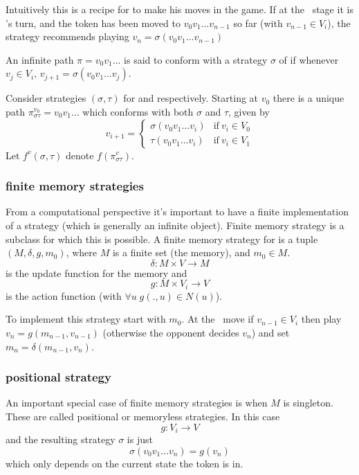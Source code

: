 Intuitively this is a recipe for  to make his moves in the game. If at the \nth\ stage it is 's turn, and the token has been moved to $v_0v_1 \ldots v_{n-1}$ so far (with $v_{n-1} \in V_i$), the strategy recommends playing $v_n=\sigma(v_0v_1 \ldots v_{n-1})$

An infinite path $\pi= v_0 v_1 \ldots$ is said to conform with a strategy $\sigma$ of  if whenever $v_j \in V_i$, $v_{j+1}=\sigma(v_0 v_1 \ldots v_j)$.

Consider strategies $(\sigma,\tau)$ for  and  respectively. Starting at $v_0$ there is a unique path $\pi^{v_0}_{\sigma\tau}= v_0 v_1 \ldots $ which conforms with both $\sigma$ and $\tau$, given by
\begin{equation*}
v_{i+1} = \begin{cases}
\sigma(v_0v_1\ldots v_i) & \text{if}\  v_i \in V_0\\
\tau(v_0v_1\ldots v_i) & \text{if}\  v_i \in V_1
\end{cases}
\end{equation*}
Let $f^{v}(\sigma,\tau)$ denote $f(\pi^v_{\sigma\tau})$.

\subsubsection{finite memory strategies}
From a computational perspective it's important to have a finite implementation of a strategy (which is generally an infinite object). Finite memory strategy is a subclass for which this is possible. A finite memory strategy for  is a tuple $(M,\delta,g,m_0)$, where $M$ is a finite set (the memory), and $m_0 \in M$. 
\[
    \delta : M \times V \to M
\]
is the update function for the memory and
\[
    g : M \times V_i \to V
\]
is the action function (with $\forall u \; g(.,u) \in N(u)$).

To implement this strategy start with $m_0$. At the \nth\ move if $v_{n-1} \in V_i$ then play $v_n=g(m_{n-1},v_{n-1})$ (otherwise the opponent decides $v_n$) and set $m_n = \delta(m_{n-1},v_n)$.
\subsubsection{positional strategy}
An important special case of finite memory strategies is when $M$ is singleton. These are called positional or memoryless strategies. In this case
\[
    g : V_i \to V
\]
and the resulting strategy $\sigma$ is just
\[
    \sigma( v_0 v_1 \ldots v_n ) = g(v_n)
\]
which only depends on the current state the token is in.

